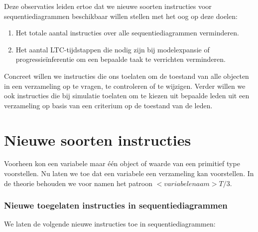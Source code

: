 Deze observaties leiden ertoe dat we nieuwe soorten instructies voor sequentiediagrammen beschikbaar willen stellen met het oog op deze doelen:

\begin{enumerate}
	\item Het totale aantal instructies over alle sequentiediagrammen verminderen.
	\item Het aantal LTC-tijdstappen die nodig zijn bij modelexpansie of progressie\"inferentie om een bepaalde taak te verrichten verminderen.
\end{enumerate}

Concreet willen we instructies die ons toelaten om de toestand van alle objecten in een verzameling op te vragen, te controleren of te wijzigen. Verder willen we ook instructies die bij simulatie toelaten om te kiezen uit bepaalde leden uit een verzameling op basis van een criterium op de toestand van de leden.

\section{Nieuwe soorten instructies}\label{sec:new-instr}

Voorheen kon een variabele maar \'e\'en object of waarde van een primitief type voorstellen. Nu laten we toe dat een variabele een verzameling kan voorstellen. In de theorie behouden we voor namen het patroon $<variabelenaam>T/3$.

\subsubsection{Nieuwe toegelaten instructies in sequentiediagrammen}

We laten de volgende nieuwe instructies toe in sequentiediagrammen:

